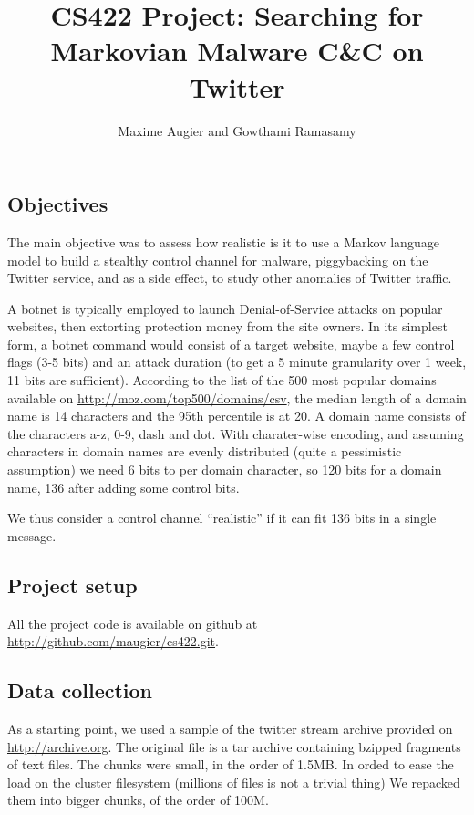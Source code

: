 \documentclass[a4paper,11pt]{article}
\title{CS422 Project: Searching for Markovian Malware C\&C on Twitter}
\author{Maxime Augier and Gowthami Ramasamy}
\begin{document}
\maketitle


\subsection{Objectives}

The main objective was to assess how realistic is it to use a Markov language model to build a stealthy control channel for malware, piggybacking on the Twitter service, and as a side effect, to study other anomalies of Twitter traffic.

A botnet is typically employed to launch Denial-of-Service attacks on popular websites, then extorting protection money from the site
owners. In its simplest form, a botnet command would consist of a target website, maybe a few control flags (3-5 bits) and an attack duration (to get a 5 minute granularity over 1 week, 11 bits are sufficient). According to the list of the 500 most popular domains available on \url{http://moz.com/top500/domains/csv}, the median length of a domain name is 14 characters and the 95th percentile is at 20. A domain name consists of the characters a-z, 0-9, dash and dot. With charater-wise encoding, and assuming characters in domain names are evenly distributed (quite a pessimistic assumption) we need 6 bits to per domain character, so 120 bits for a domain name, 136 after adding some control bits.

We thus consider a control channel ``realistic'' if it can fit 136 bits in a single message.


\subsection{Project setup}

All the project code is available on github at \url{http://github.com/maugier/cs422.git}. 

\subsection{Data collection}

As a starting point, we used a sample of the twitter stream archive provided on \url{http://archive.org}. The original file is a tar archive containing bzipped fragments of text files. The chunks were small, in the order of 1.5MB. In orded to ease the load on the cluster filesystem (millions of files is not a trivial thing) We repacked them into bigger chunks, of the order of 100M.
\end{document}
